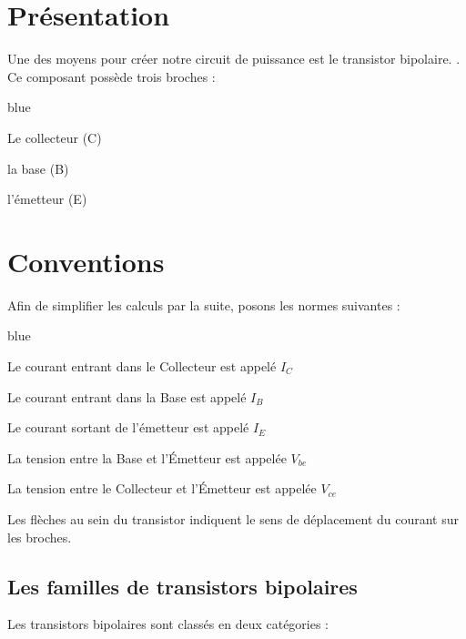 \section{Présentation}

Une des moyens pour créer notre circuit de puissance est le transistor bipolaire. . Ce composant possède trois broches : 

\begin{items}{blue}{\Triangle}

  \item Le collecteur (C)
  \item la base (B)
  \item l'émetteur (E)

\end{items}


\section{Conventions}

Afin de simplifier les calculs par la suite, posons les normes suivantes : 

\begin{items}{blue}{\Triangle}

  \item Le courant entrant dans le Collecteur est appelé $I_{C}$
  \item Le courant entrant dans la Base est appelé $I_{B}$
  \item Le courant sortant de l'émetteur est appelé $I_{E}$

  \item La tension entre la Base et l’Émetteur est appelée $V_{be}$
  \item La tension entre le Collecteur et l’Émetteur est appelée $V_{ce}$
\end{items}



Les flèches au sein du transistor indiquent le sens de déplacement du courant sur les broches.

\subsection{Les familles de transistors bipolaires}

Les transistors bipolaires sont classés en deux catégories : 

